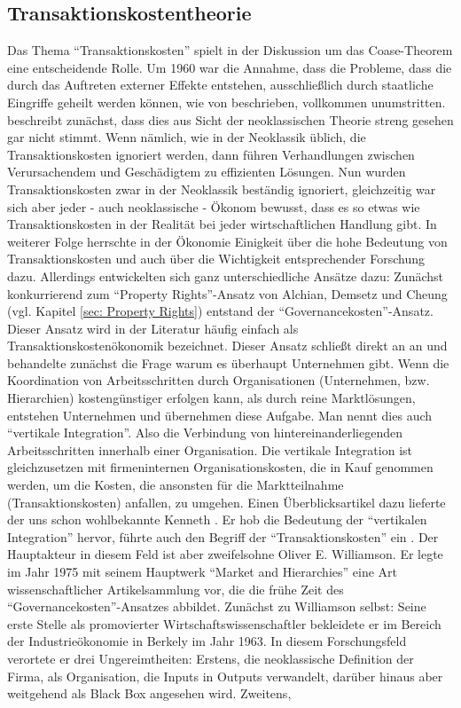 \subsection{Transaktionskostentheorie}
\label{sec: Transaktionskosten}

Das Thema "`Transaktionskosten"' spielt in der Diskussion um das Coase-Theorem \textcite{Coase1960} eine entscheidende Rolle. Um 1960 war die Annahme, dass die Probleme, dass die durch das Auftreten externer Effekte entstehen, ausschließlich durch staatliche Eingriffe geheilt werden können, wie von \textcite{Pigou1920} beschrieben, vollkommen unumstritten. \textcite{Coase1960} beschreibt zunächst, dass dies aus Sicht der neoklassischen Theorie streng gesehen gar nicht stimmt. Wenn nämlich, wie in der Neoklassik üblich, die Transaktionskosten ignoriert werden, dann führen Verhandlungen zwischen Verursachendem und Geschädigtem zu effizienten Lösungen. Nun wurden Transaktionskosten zwar in der Neoklassik beständig ignoriert, gleichzeitig war sich aber jeder - auch neoklassische - Ökonom bewusst, dass es so etwas wie Transaktionskosten in der Realität bei jeder wirtschaftlichen Handlung gibt. In weiterer Folge herrschte in der Ökonomie Einigkeit über die hohe Bedeutung von Transaktionskosten und auch über die Wichtigkeit entsprechender Forschung dazu. Allerdings entwickelten sich ganz unterschiedliche Ansätze dazu: Zunächst konkurrierend zum "`Property Rights"'-Ansatz von Alchian, Demsetz und Cheung (vgl. Kapitel \ref{sec: Property Rights}) entstand der "`Governancekosten"'-Ansatz. Dieser Ansatz wird in der Literatur häufig einfach als Transaktionskostenökonomik bezeichnet. Dieser Ansatz schließt direkt an \textcite{Coase1960} an und behandelte zunächst die Frage warum es überhaupt Unternehmen gibt. Wenn die Koordination von Arbeitsschritten durch Organisationen (Unternehmen, bzw. Hierarchien) kostengünstiger erfolgen kann, als durch reine Marktlösungen, entstehen Unternehmen und übernehmen diese Aufgabe. Man nennt dies auch "`vertikale Integration"'. Also die Verbindung von hintereinanderliegenden Arbeitsschritten innerhalb einer Organisation. Die vertikale Integration ist gleichzusetzen mit firmeninternen Organisationskosten, die in Kauf genommen werden, um die Kosten, die ansonsten für die Marktteilnahme (Transaktionskosten) anfallen, zu umgehen. Einen Überblicksartikel dazu lieferte der uns schon wohlbekannte Kenneth \textcite{Arrow1969}. Er hob die Bedeutung der "`vertikalen Integration"' hervor, führte auch den Begriff der "`Transaktionskosten"' ein \parencite[S. 39]{Erlei2016}. Der Hauptakteur in diesem Feld ist aber zweifelsohne Oliver E. Williamson. Er legte im Jahr 1975 mit seinem Hauptwerk "`Market and Hierarchies"' \parencite{Williamson1975} eine Art wissenschaftlicher Artikelsammlung \parencite[S. 87]{Voigt2009} vor, die die frühe Zeit des  "`Governancekosten"'-Ansatzes abbildet. Zunächst zu Williamson selbst: Seine erste Stelle als promovierter Wirtschaftswissenschaftler bekleidete er im Bereich der Industrieökonomie in Berkely im Jahr 1963. In diesem Forschungsfeld verortete er drei Ungereimtheiten: Erstens, die neoklassische Definition der Firma, als Organisation, die Inputs in Outputs verwandelt, darüber hinaus aber weitgehend als Black Box angesehen wird. Zweitens, 